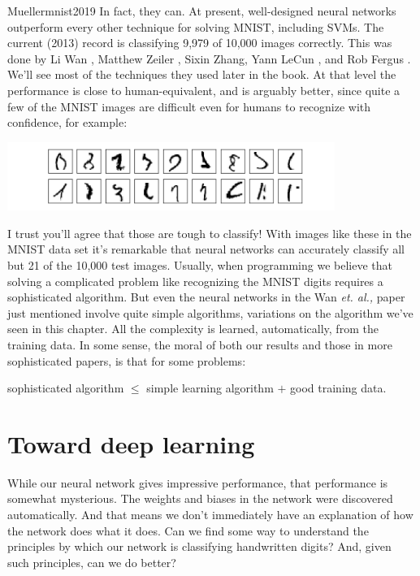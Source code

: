 Muellermnist2019
In fact, they can. At present, well-designed neural networks outperform every other technique for solving MNIST, including SVMs. The current (2013) record is classifying 9,979 of 10,000 images correctly. This was done by Li Wan \cite{wanli2019}, Matthew Zeiler \cite{matthewzeiler2019}, Sixin Zhang, Yann LeCun \cite{yannlecun2019}, and Rob Fergus \cite{RobFergus2019}. We'll see most of the techniques they used later in the book. At that level the performance is close to human-equivalent, and is arguably better, since quite a few of the MNIST images are difficult even for humans to recognize with confidence, for example:


{\centering
\includegraphics[width=0.8\textwidth,]{pic/digits-unreadable}
\par}



I trust you'll agree that those are tough to classify! With images like these in the MNIST data set it's remarkable that neural networks can accurately classify all but 21 of the 10,000 test images. Usually, when programming we believe that solving a complicated problem like recognizing the MNIST digits requires a sophisticated algorithm. But even the neural networks in the Wan \textit{et. al.,} paper just mentioned involve quite simple algorithms, variations on the algorithm we've seen in this chapter. All the complexity is learned, automatically, from the training data. In some sense, the moral of both our results and those in more sophisticated papers, is that for some problems: 

sophisticated algorithm $\leq$ simple learning algorithm $+$ good training data. 

\section{Toward deep learning}

While our neural network gives impressive performance, that performance is somewhat mysterious. The weights and biases in the network were discovered automatically. And that means we don't immediately have an explanation of how the network does what it does. Can we find some way to understand the principles by which our network is classifying handwritten digits? And, given such principles, can we do better?

